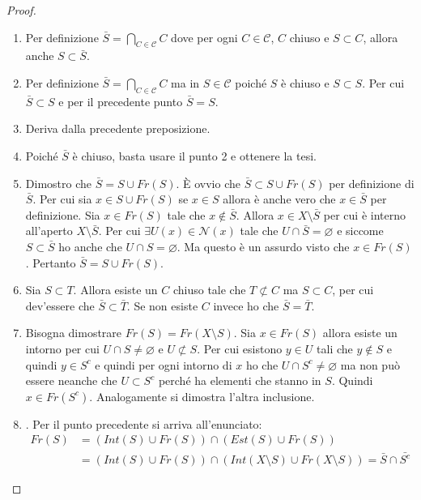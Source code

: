 \begin{proof}
	\begin{enumerate}
		\item Per definizione $\bar{S} = \bigcap_{C \in \mathcal{C}} C$ dove per ogni $C \in \mathcal{C}$, $C$ chiuso e $S \subset C$, allora anche $S \subset \bar{S}$.
		\item Per definizione $\bar{S} = \bigcap_{C \in \mathcal{C}} C$ ma in $S \in \mathcal{C}$ poiché $S$ è chiuso e $S \subset S$. Per cui $\bar{S} \subset S$ e per il precedente punto $\bar{S} = S$.
		\item Deriva dalla precedente preposizione.
		\item Poiché $\bar{S}$ è chiuso, basta usare il punto 2 e ottenere la tesi.
		\item Dimostro che $\bar{S}= S \cup Fr(S)$. È ovvio che $\bar{S} \subset S \cup Fr(S)$ per definizione di $\bar{S}$. Per cui sia $x \in S \cup Fr(S)$ se $x \in S$ allora è anche vero che $x \in \bar{S}$ per definizione. Sia $x \in Fr(S)$ tale che $x \notin \bar{S}$. Allora $x \in X \setminus \bar{S}$ per cui è interno all'aperto $X \setminus \bar{S}$. Per cui $\exists U(x) \in \mathcal{N}(x)$ tale che $U \cap \bar{S} = \varnothing$ e siccome $S \subset \bar{S}$ ho anche che $U \cap S = \varnothing$. Ma questo è un assurdo visto che $x \in Fr(S)$. Pertanto $\bar{S} = S \cup Fr(S)$.
		\item Sia $S \subset T$. Allora esiste un $C$ chiuso tale che $T \not\subset C$ ma $S \subset C$, per cui dev'essere che $\bar{S} \subset \bar{T}$. Se non esiste $C$ invece ho che $\bar{S} = \bar{T}$.
		\item Bisogna dimostrare $Fr(S)= Fr(X \setminus S)$. Sia $x \in Fr(S)$ allora esiste un intorno per cui $U \cap S \neq \varnothing$ e $U \not\subset S$. Per cui esistono $y\in U$ tali che $y \notin S$ e quindi $y \in S^c$ e quindi per ogni intorno di $x$ ho che $U \cap S^c \neq \varnothing$ ma non può essere neanche che $U \subset S^c$ perché ha elementi che stanno in $S$. Quindi $x \in Fr(S^c)$. Analogamente si dimostra l'altra inclusione.  
		\item . Per il punto precedente si arriva all'enunciato:
		\begin{align*}
			Fr(S) & = (Int(S) \cup Fr(S)) \cap (Est(S) \cup Fr(S)) \\
					& = (Int(S) \cup Fr(S)) \cap (Int(X \setminus S) \cup Fr(X \setminus S)) = \bar{S} \cap \bar{S^c} 
		\end{align*}
	\end{enumerate}
\end{proof}

